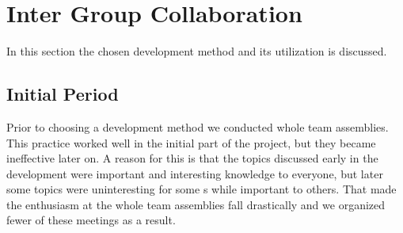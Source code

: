 \section{Inter Group Collaboration}
\label{sec:intergroup}
In this section the chosen development method and its utilization is discussed. 

\subsection{Initial Period}
Prior to choosing a development method we conducted whole team assemblies. 
This practice worked well in the initial part of the project, but they became ineffective later on. 
A reason for this is that the topics discussed early in the development were important and interesting knowledge to everyone, but later some topics were uninteresting for some \subgroup{}s while important to others.
That made the enthusiasm at the whole team assemblies fall drastically and we organized fewer of these meetings as a result.


